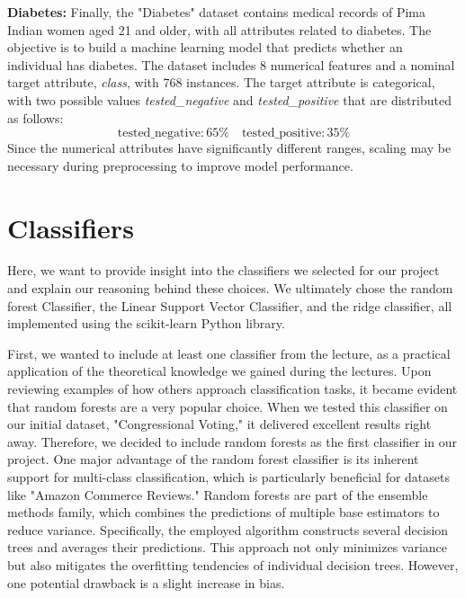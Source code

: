 \documentclass[a4paper,10pt]{article}
\begin{document}
\textbf{Diabetes:} Finally, the "Diabetes" dataset contains medical records of Pima Indian women aged 21 and older, with all attributes related to diabetes. The objective is to build a machine learning model that predicts whether an individual has diabetes. The dataset includes 8 numerical features and a nominal target attribute, \emph{class}, with 768 instances. The target attribute is categorical, with two possible values \emph{tested\_negative} and \emph{tested\_positive} that are distributed as follows:
\begin{equation*}
    \text{tested\_negative:} \,65\% \quad \text{tested\_positive:}\,35\%
\end{equation*} 
Since the numerical attributes have significantly different ranges, scaling may be necessary during preprocessing to improve model performance.

\section{Classifiers}

Here, we want to provide insight into the classifiers we selected for our project and explain our reasoning behind these choices. We ultimately chose the random forest Classifier, the Linear Support Vector Classifier, and the ridge classifier, all implemented using the scikit-learn Python library.

First, we wanted to include at least one classifier from the lecture, as a practical application of the theoretical knowledge we gained during the lectures. Upon reviewing examples of how others approach classification tasks, it became evident that random forests are a very popular choice. When we tested this classifier on our initial dataset, "Congressional Voting," it delivered excellent results right away. Therefore, we decided to include random forests as the first classifier in our project. One major advantage of the random forest classifier is its inherent support for multi-class classification, which is particularly beneficial for datasets like "Amazon Commerce Reviews." Random forests are part of the ensemble methods family, which combines the predictions of multiple base estimators to reduce variance. Specifically, the employed algorithm constructs several decision trees and averages their predictions. This approach not only minimizes variance but also mitigates the overfitting tendencies of individual decision trees. However, one potential drawback is a slight increase in bias.
\end{document}
